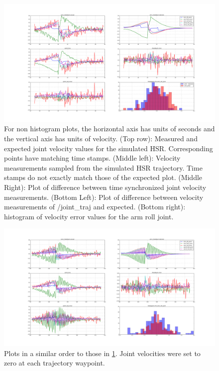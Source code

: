 \documentclass[12pt]{article}
\begin{document}
        \begin{figure}
            \includegraphics[width=\linewidth]{2020.04.03/t8/figure_1_first_100_points_20_bins_trial6.png}
            \centering
            \caption{For non histogram plots, the horizontal axis has units of seconds and the vertical axis has units of velocity. (Top row): Measured and expected joint velocity values for the simulated HSR. Corresponding points have matching time stamps. (Middle left): Velocity measurements sampled from the simulated HSR trajectory. Time stamps do not exactly match those of the expected plot. (Middle Right): Plot of difference between time synchronized joint velocity measurements. (Bottom Left): Plot of difference between velocity measurements of /joint\_traj and expected. (Bottom right): histogram of velocity error values for the arm roll joint.}
            \label{fig:velocityAccuracy}
        \end{figure}
        \begin{figure}[ht]
            \includegraphics[width=\linewidth]{2020.04.07/arm_vel_goals_set_to_zero.png}
            \centering
            \caption{Plots in a similar order to those in \cref{fig:velocityAccuracy}. Joint velocities were set to zero at each trajectory waypoint.}
            \label{fig:velocityZero}
        \end{figure}
\end{document}
